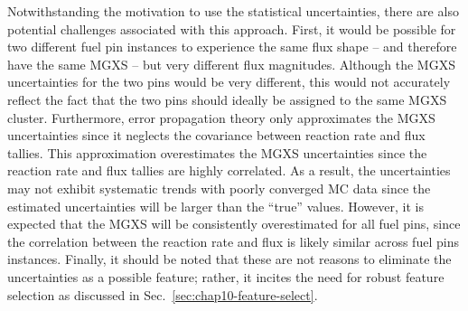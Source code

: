 Notwithstanding the motivation to use the statistical uncertainties, there are also potential challenges associated with this approach. First, it would be possible for two different fuel pin instances to experience the same flux shape -- and therefore have the same \ac{MGXS} -- but very different flux magnitudes. Although the \ac{MGXS} uncertainties for the two pins would be very different, this would not accurately reflect the fact that the two pins should ideally be assigned to the same \ac{MGXS} cluster. Furthermore, error propagation theory only approximates the \ac{MGXS} uncertainties since it neglects the covariance between reaction rate and flux tallies. This approximation overestimates the \ac{MGXS} uncertainties since the reaction rate and flux tallies are highly correlated. As a result, the uncertainties may not exhibit systematic trends with poorly converged \ac{MC} data since the estimated uncertainties will be larger than the ``true'' values. However, it is expected that the \ac{MGXS} will be consistently overestimated for all fuel pins, since the correlation between the reaction rate and flux is likely similar across fuel pins instances. Finally, it should be noted that these are not reasons to eliminate the uncertainties as a possible feature; rather, it incites the need for robust feature selection as discussed in Sec.~\ref{sec:chap10-feature-select}.


